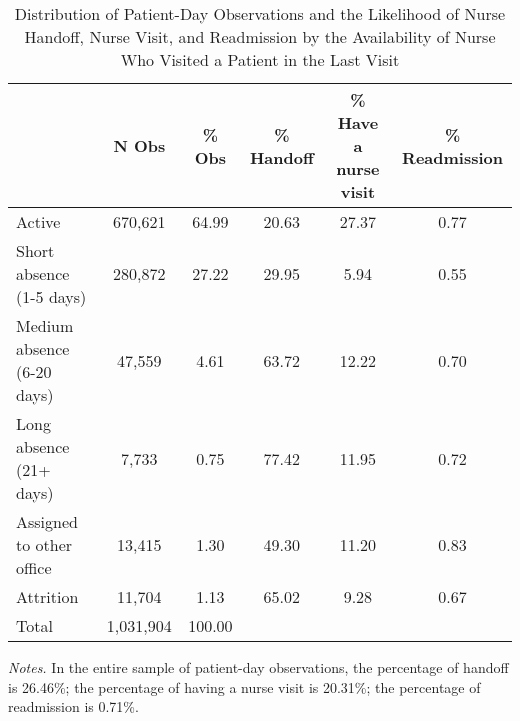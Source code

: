 \documentclass[final,12pt, notitlepage]{article}
\begin{document}
\begin{singlespace}
\begin{table}[H]
\centering
\footnotesize
\caption{Distribution of Patient-Day Observations and the Likelihood of Nurse Handoff, Nurse Visit, and Readmission by the Availability of Nurse Who Visited a Patient in the Last Visit}
\label{tab:lws_dist_alt}
\begin{threeparttable}
\begin{tabular}{lccccc}
\toprule
& N Obs                    & \% Obs & \% Handoff & \% Have a nurse visit & \% Readmission   \\
\midrule
Active                   & 670,621 & 64.99      & 20.63            & 27.37          & 0.77 \\
Short absence (1-5 days) & 280,872 & 27.22      & 29.95            & 5.94           & 0.55 \\
Medium absence (6-20 days)     & 47,559  & 4.61       & 63.72            & 12.22          & 0.70 \\
Long absence (21+ days)  & 7,733  & 0.75       & 77.42            & 11.95          & 0.72 \\
Assigned to other office     & 13,415  & 1.30       & 49.30            & 11.20          & 0.83 \\
Attrition           & 11,704  & 1.13       & 65.02            & 9.28           & 0.67 \\
\midrule
Total                    & 1,031,904 & 100.00      &           &         \\
\bottomrule
\end{tabular}
	\begin{tablenotes}
	\footnotesize
	\item \emph{Notes.} In the entire sample of patient-day observations, the percentage of handoff is 26.46\%; the percentage of having a nurse visit is 20.31\%; the percentage of readmission is 0.71\%.
\end{tablenotes}
\end{threeparttable}
\end{table}



\end{singlespace}
\end{document}
